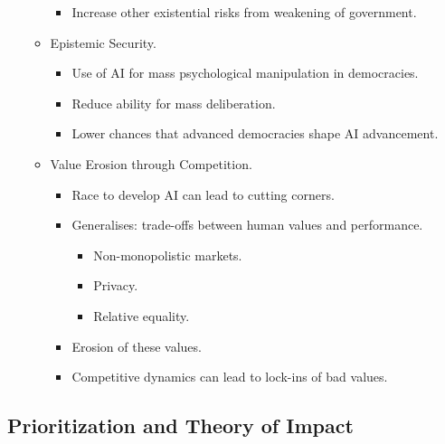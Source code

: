 \begin{itemize}
\begin{itemize}
\begin{itemize}
            \item Increase other existential risks from weakening of government.
        \end{itemize}
        \item Epistemic Security.
        \begin{itemize}
            \item Use of AI for mass psychological manipulation in democracies.
            \item Reduce ability for mass deliberation.
            \item Lower chances that advanced democracies shape AI advancement.
        \end{itemize}
        \item Value Erosion through Competition.
        \begin{itemize}
            \item Race to develop AI can lead to cutting corners.
            \item Generalises: trade-offs between human values and performance.
            \begin{itemize}
                \item Non-monopolistic markets.
                \item Privacy.
                \item Relative equality.
            \end{itemize}
            \item Erosion of these values.
            \item Competitive dynamics can lead to lock-ins of bad values.
        \end{itemize}
    \end{itemize}
\end{itemize}


\subsection{Prioritization and Theory of Impact}


